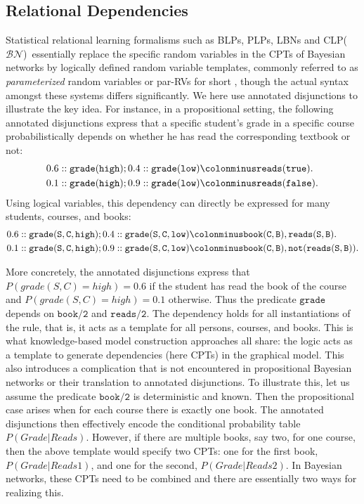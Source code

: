 \documentclass[a4paper]{article}
\newcommand{\clpbn}
  {CLP($\mathcal{BN}$)}
\begin{document}
\subsection{Relational Dependencies}
Statistical relational learning formalisms such as BLPs, PLPs, LBNs and \clpbn\
essentially replace the specific random variables in the CPTs of
Bayesian networks by logically defined random variable templates,
commonly referred to as \emph{parameterized} random variables or
par-RVs for short \citep{poole:ijcai03}, though the actual syntax
amongst these systems differs significantly. We here use annotated
disjunctions to illustrate the key idea. 
For instance, in a propositional setting, the following annotated
disjunctions express that a specific student's grade in a specific
course probabilistically depends on whether he has read the
corresponding textbook or not:
\begin{align*}
0.6::\mathtt{grade(high)} ; 0.4::\mathtt{grade(low)}  &\colonminus \mathtt{reads(true)}.\\
0.1::\mathtt{grade(high)} ; 0.9::\mathtt{grade(low)}  &\colonminus \mathtt{reads(false)}.\\
\end{align*}
Using logical variables, this dependency can directly be expressed for many
students, courses, and books: 
\begin{align*}
0.6::\mathtt{grade(S,C,high)} ; 0.4::\mathtt{grade(S,C,low)}  &\colonminus \mathtt{book(C,B), reads(S,B)}.\\
0.1::\mathtt{grade(S,C,high)} ; 0.9::\mathtt{grade(S,C,low)}  &\colonminus \mathtt{book(C,B), not(reads(S,B))}.\\
\end{align*}

More concretely, the annotated disjunctions express that $P(grade(S,C) = high) = 0.6$ 
if  the student has read the book of the course 
and $P(grade(S,C) = high) = 0.1$ otherwise.  Thus the predicate $\mathtt{grade}$ depends on $\mathtt{book/2}$ and $\mathtt{reads/2}$.  
The dependency holds for all instantiations of the rule, that is, it acts as a template for all persons, courses, and books.  
This is what knowledge-based model construction approaches all share: the logic acts as a template to generate
dependencies (here CPTs) in the graphical model. 
This also introduces a complication that is not encountered in propositional Bayesian networks
or their translation to annotated disjunctions. To illustrate this, let us 
assume the predicate $\mathtt{book/2}$ is deterministic and known. Then the propositional case 
arises when for each course there is exactly one book. The annotated disjunctions then effectively encode
the conditional probability table $P(Grade | Reads)$. However, if there are multiple books, say two,  
for one course, then the above template would specify two CPTs:
one for the first book, $P(Grade | Reads1)$, and one for the second, $P(Grade | Reads2)$. 
In Bayesian networks, these CPTs need to be combined and there are essentially two ways for realizing this. 
\end{document}
